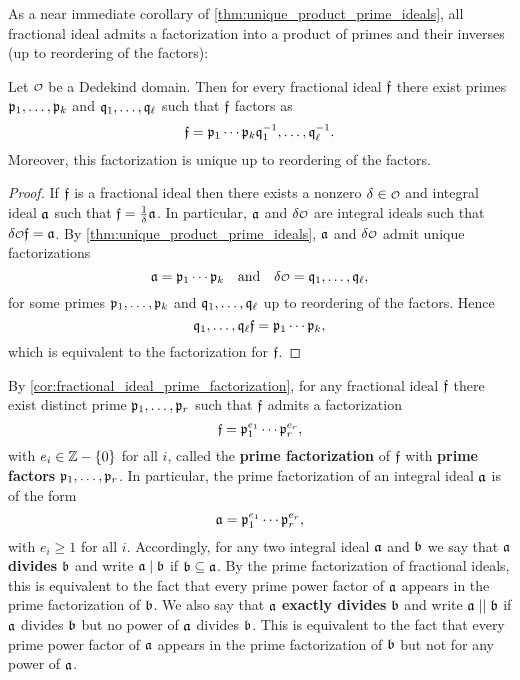     As a near immediate corollary of \cref{thm:unique_product_prime_ideals}, all fractional ideal admits a factorization into a product of primes and their inverses (up to reordering of the factors):

    \begin{corollary}\label{cor:fractional_ideal_prime_factorization}
      Let $\smc{O}$ be a Dedekind domain. Then for every fractional ideal $\mathfrak{f}$ there exist primes $\mathfrak{p}_{1},\ldots,\mathfrak{p}_{k}$ and $\mathfrak{q}_{1},\ldots,\mathfrak{q}_{\ell}$ such that $\mathfrak{f}$ factors as
      \[
        \mathfrak{f} = \mathfrak{p}_{1} \cdots \mathfrak{p}_{k}\mathfrak{q}_{1}^{-1},\ldots,\mathfrak{q}_{\ell}^{-1}.
      \]
      Moreover, this factorization is unique up to reordering of the factors.
    \end{corollary}
    \begin{proof}
      If $\mathfrak{f}$ is a fractional ideal then there exists a nonzero $\d \in \smc{O}$ and integral ideal $\mathfrak{a}$ such that $\mathfrak{f} = \frac{1}{\delta}\mathfrak{a}$. In particular, $\mathfrak{a}$ and $\d\smc{O}$ are integral ideals such that $\d\smc{O}\mf{f} = \mf{a}$. By \cref{thm:unique_product_prime_ideals}, $\mathfrak{a}$ and $\d\smc{O}$ admit unique factorizations
      \[
        \mf{a} = \mf{p}_{1} \cdots \mf{p}_{k} \quad \text{and} \quad \d\smc{O} = \mf{q}_{1},\ldots,\mf{q}_{\ell},
      \]
      for some primes $\mathfrak{p}_{1},\ldots,\mathfrak{p}_{k}$ and $\mathfrak{q}_{1},\ldots,\mathfrak{q}_{\ell}$ up to reordering of the factors. Hence
      \[
        \mathfrak{q}_{1},\ldots,\mathfrak{q}_{\ell}\mathfrak{f} = \mathfrak{p}_{1} \cdots \mathfrak{p}_{k},
      \]
      which is equivalent to the factorization for $\mathfrak{f}$.
    \end{proof}

    By \cref{cor:fractional_ideal_prime_factorization}, for any fractional ideal $\mathfrak{f}$ there exist distinct prime $\mathfrak{p}_{1},\ldots,\mathfrak{p}_{r}$ such that $\mathfrak{f}$ admits a factorization
    \[
      \mathfrak{f} = \mathfrak{p}_{1}^{e_{1}} \cdots \mathfrak{p}_{r}^{e_{r}},
    \]
    with $e_{i} \in \mathbb{Z}-\{0\}$ for all $i$, called the \textbf{prime factorization} of $\mathfrak{f}$ with \textbf{prime factors} $\mathfrak{p}_{1},\ldots,\mathfrak{p}_{r}$. In particular, the prime factorization of an integral ideal $\mathfrak{a}$ is of the form
    \[
      \mathfrak{a} = \mathfrak{p}_{1}^{e_{1}} \cdots \mathfrak{p}_{r}^{e_{r}},
    \]
    with $e_{i} \ge 1$ for all $i$. Accordingly, for any two integral ideal $\mathfrak{a}$ and $\mathfrak{b}$ we say that $\mathfrak{a}$ \textbf{divides} $\mathfrak{b}$ and write $\mathfrak{a} \mid \mathfrak{b}$ if $\mathfrak{b} \subseteq \mathfrak{a}$. By the prime factorization of fractional ideals, this is equivalent to the fact that every prime power factor of $\mathfrak{a}$ appears in the prime factorization of $\mathfrak{b}$. We also say that $\mathfrak{a}$ \textbf{exactly divides} $\mathfrak{b}$ and write $\mathfrak{a} \mid\mid \mathfrak{b}$ if $\mathfrak{a}$ divides $\mathfrak{b}$ but no power of $\mathfrak{a}$ divides $\mathfrak{b}$. This is equivalent to the fact that every prime power factor of $\mathfrak{a}$ appears in the prime factorization of $\mathfrak{b}$ but not for any power of $\mathfrak{a}$.
    
